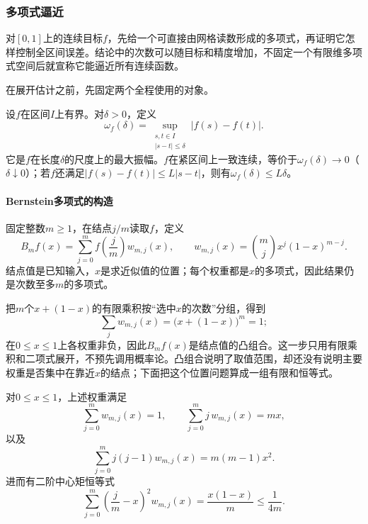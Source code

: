 \subsubsection{多项式逼近}
\label{subsubsec:polynomial-approximation}

对$[0,1]$上的连续目标$f$，先给一个可直接由网格读数形成的多项式，再证明它怎样控制全区间误差。结论中的次数可以随目标和精度增加，不固定一个有限维多项式空间后就宣称它能逼近所有连续函数。

在展开估计之前，先固定两个全程使用的对象。

\begin{definition}[连续模]
设$f$在区间$I$上有界。对$\delta>0$，定义
\[
  \omega_f(\delta)=\sup_{\substack{s,t\in I\\|s-t|\le\delta}}|f(s)-f(t)|.
\]
它是$f$在长度$\delta$的尺度上的最大振幅。$f$在紧区间上一致连续，等价于$\omega_f(\delta)\to0$（$\delta\downarrow0$）；若$f$还满足$|f(s)-f(t)|\le L|s-t|$，则有$\omega_f(\delta)\le L\delta$。
\label{def:functional-continuity-modulus}
\end{definition}

\paragraph{Bernstein多项式的构造}

固定整数$m\ge1$，在结点$j/m$读取$f$，定义
\begin{equation}
  B_mf(x)=\sum_{j=0}^{m}f\!\left(\frac jm\right)w_{m,j}(x),
  \qquad
  w_{m,j}(x)=\binom mjx^j(1-x)^{m-j}.
  \label{eq:functional-bernstein-polynomial}
\end{equation}
结点值是已知输入，$x$是求近似值的位置；每个权重都是$x$的多项式，因此结果仍是次数至多$m$的多项式。

把$m$个$x+(1-x)$的有限乘积按“选中$x$的次数”分组，得到
\[
  \sum_jw_{m,j}(x)=\bigl(x+(1-x)\bigr)^m=1;
\]
在$0\le x\le1$上各权重非负，因此$B_mf(x)$是结点值的凸组合。这一步只用有限乘积和二项式展开，不预先调用概率论。凸组合说明了取值范围，却还没有说明主要权重是否集中在靠近$x$的结点；下面把这个位置问题算成一组有限和恒等式。

\begin{lemma}[Bernstein权重的矩]
对$0\le x\le1$，上述权重满足
\[
  \sum_{j=0}^m w_{m,j}(x)=1,\qquad
  \sum_{j=0}^m j\,w_{m,j}(x)=mx,
\]
以及
\[
  \sum_{j=0}^m j(j-1)w_{m,j}(x)=m(m-1)x^2.
\]
进而有二阶中心矩恒等式
\begin{equation}
  \sum_{j=0}^m\left(\frac jm-x\right)^2w_{m,j}(x)
  =\frac{x(1-x)}m\le\frac1{4m}.
  \label{eq:functional-bernstein-second-moment}
\end{equation}
\end{lemma}

